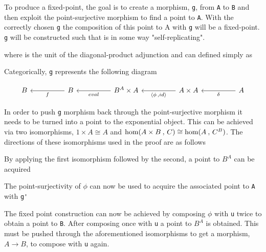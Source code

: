 To produce a fixed-point, the goal is to create a morphism, \verb|g|, from \verb|A| to
\verb|B| and then exploit the point-surjective morphism to find a point to
\verb|A|. With the correctly chosen \verb|g| the composition of this point to A
with \verb|g| will be a fixed-point. \verb|g| will be constructed such that is
in some way "self-replicating".


where \AgdaFunction{$\delta$} is the unit of the diagonal-product adjunction and can
defined simply as

Categorically, \verb|g| represents the following diagram

\[\begin{tikzcd}[sep=huge]
    B & B \arrow[l, "f"] & B^A \times A \arrow[l, "eval"] & A \times A \arrow[l,
    "{\langle \phi \, , id\rangle}"] & A \arrow[l, "\delta"]
\end{tikzcd}\]

In order to push \verb|g| morphism back through the point-surjective morphism
it needs to be turned into a point to the exponential object. This can be
achieved via two isomorphisms, $1 \times A \cong A$ and $\textnormal{hom}(A \times B \: , \, C)
\cong \textnormal{hom}(A \: , \, C^B)$. The directions of these isomorphisms
used in the proof are as follows
\begin{AgdaMultiCode}
\end{AgdaMultiCode}

By applying the first isomorphism followed by the second, a point to $B^A$ can
be acquired
\begin{AgdaAlign}

The point-surjectivity of $\phi$ can now be used to acquire the associated point
to \verb|A| with \verb|g'|

\end{AgdaAlign}

The fixed point construction can now be achieved by composing $\phi$ with
\verb|u| twice to obtain a point to \verb|B|. After composing once with \verb|u|
a point to $B^A$ is obtained. This must be pushed through the aforementioned
isomorphisms to get a morphism, $A \rightarrow B$, to compose with \verb|u|
again.


